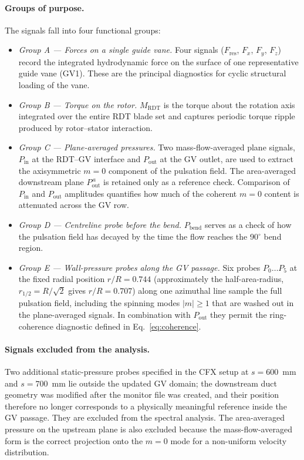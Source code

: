 \paragraph{Groups of purpose.}
The signals fall into four functional groups:
\begin{itemize}
  \item \emph{Group A — Forces on a single guide vane.} Four signals
        ($F_{\mathrm{res}}$, $F_x$, $F_y$, $F_z$) record the
        integrated hydrodynamic force on the surface of one
        representative guide vane (GV1). These are the principal
        diagnostics for cyclic structural loading of the vane.
  \item \emph{Group B — Torque on the rotor.}
        $M_{\mathrm{RDT}}$ is the torque about the rotation axis
        integrated over the entire \ac{RDT} blade set and captures
        periodic torque ripple produced by rotor--stator
        interaction.
  \item \emph{Group C — Plane-averaged pressures.} Two mass-flow-averaged
        plane signals, $P_{\mathrm{in}}$ at the \ac{RDT}--\ac{GV}
        interface and $P_{\mathrm{out}}$ at the \ac{GV} outlet, are
        used to extract the axisymmetric $m=0$ component of the
        pulsation field. The area-averaged downstream plane
        $P_{\mathrm{out}}^{\,a}$ is retained only as a reference check.
        Comparison of $P_{\mathrm{in}}$ and $P_{\mathrm{out}}$
        amplitudes quantifies how much of the coherent $m=0$ content
        is attenuated across the \ac{GV} row.
  \item \emph{Group D — Centreline probe before the bend.}
        $P_{\mathrm{bend}}$ serves as a check of how the pulsation
        field has decayed by the time the flow reaches the 90$^\circ$
        bend region.
  \item \emph{Group E — Wall-pressure probes along the GV passage.}
        Six probes $P_0 \ldots P_5$ at the fixed radial position
        $r/R = 0.744$ (approximately the half-area-radius,
        $r_{1/2} = R/\sqrt{2}$ gives $r/R = 0.707$) along one
        azimuthal line sample the full pulsation field, including
        the spinning modes $|m|\geq 1$ that are washed out in the
        plane-averaged signals. In combination with $P_{\mathrm{out}}$
        they permit the ring-coherence diagnostic defined in
        Eq.~\eqref{eq:coherence}.
\end{itemize}

\paragraph{Signals excluded from the analysis.}
Two additional static-pressure probes specified in the CFX setup at
$s = 600$~mm and $s = 700$~mm lie outside the updated \ac{GV}
domain; the downstream duct geometry was modified after the monitor
file was created, and their position therefore no longer corresponds
to a physically meaningful reference inside the \ac{GV} passage.
They are excluded from the spectral analysis. The area-averaged
pressure on the upstream plane is also excluded because the
mass-flow-averaged form is the correct projection onto the $m=0$
mode for a non-uniform velocity distribution.

